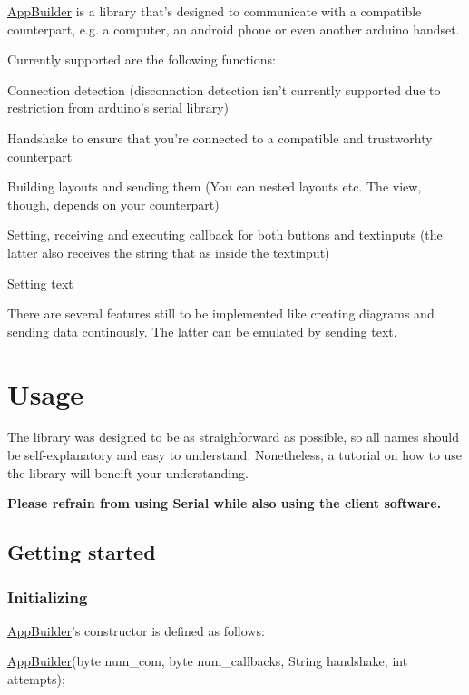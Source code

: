 \hyperlink{class_app_builder}{App\+Builder} is a library that's designed to communicate with a compatible counterpart, e.\+g. a computer, an android phone or even another arduino handset.

Currently supported are the following functions\+:
\begin{DoxyItemize}
\item Connection detection (disconnction detection isn't currently supported due to restriction from arduino's serial library)
\item Handshake to ensure that you're connected to a compatible and trustworhty counterpart
\item Building layouts and sending them (You can nested layouts etc. The view, though, depends on your counterpart)
\item Setting, receiving and executing callback for both buttons and textinputs (the latter also receives the string that as inside the textinput)
\item Setting text
\end{DoxyItemize}

There are several features still to be implemented like creating diagrams and sending data continously. The latter can be emulated by sending text.

\section*{Usage}

The library was designed to be as straighforward as possible, so all names should be self-\/explanatory and easy to understand. Nonetheless, a tutorial on how to use the library will beneift your understanding.

{\bfseries Please refrain from using Serial while also using the client software.}

\subsection*{Getting started}

\subsubsection*{Initializing}

\hyperlink{class_app_builder}{App\+Builder}'s constructor is defined as follows\+:


\begin{DoxyCode}
\hyperlink{class_app_builder}{AppBuilder}(byte num\_com, byte num\_callbacks, String handshake, \textcolor{keywordtype}{int} attempts);
\end{DoxyCode}


